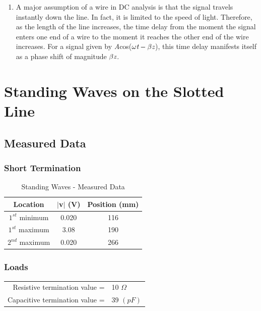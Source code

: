 \documentclass{article}
\begin{document}
\begin{enumerate}
\begin{enumerate}
	\end{enumerate}
	\item A major assumption of a wire in DC analysis is that the signal travels instantly down the line. In fact, it is limited to the speed of light. Therefore, as the length of the line increases, the time delay from the moment the signal enters one end of a wire to the moment it reaches the other end of the wire increases. For a signal given by \emph{A}cos($\omega\emph{t}-\beta\emph{z}$), this time delay manifests itself as a phase shift of magnitude $\beta\emph{z}$.
\end{enumerate}

\section{Standing Waves on the Slotted Line}
\subsection{Measured Data}
\subsubsection{Short Termination}
\begin{table}[h]
\centering
	\begin{tabular}{|c|c|c|}
	\hline
	\textbf{Location} & $\mid$v$\mid$ (V) & \textbf{Position (mm)} \\ \hline
	$1^{st}$ minimum       & 0.020   & 116                    \\ \hline
	$1^{st}$ maximum       & 3.08    & 190                    \\ \hline
	$2^{nd}$ maximum       & 0.020   & 266                    \\ \hline
	\end{tabular}
	\caption{Standing Waves - Measured Data}
	\label{my-label}
\end{table}

\subsubsection{Loads}

\begin{table}[h]
	\begin{tabular}{rl}
	Resistive termination value =  & 10 $\Omega$ \\
	Capacitive termination value = & 39 $(pF)$      
	\end{tabular}
\end{table}
\end{document}
